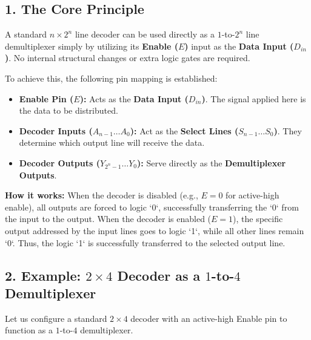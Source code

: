 \documentclass[12pt,a3paper]{article}
\begin{document}
\begin{enumerate}
\begin{tcolorbox}[enhanced,breakable,ansbox,colback=cD!4,colframe=cD,boxrule=0.8pt,arc=5pt,title={\textbf{Answer}},fonttitle=\bfseries\color{white},colbacktitle=cD]
\subsection*{1. The Core Principle}
A standard $n \times 2^n$ line decoder can be used directly as a $1$-to-$2^n$ line demultiplexer simply by utilizing its \textbf{Enable ($E$)} input as the \textbf{Data Input ($D_{in}$)}. No internal structural changes or extra logic gates are required.

To achieve this, the following pin mapping is established:
\begin{itemize}
    \item \textbf{Enable Pin ($E$):} Acts as the \textcolor{cD}{\textbf{Data Input ($D_{in}$)}}. The signal applied here is the data to be distributed.
    \item \textbf{Decoder Inputs ($A_{n-1} \dots A_0$):} Act as the \textbf{Select Lines ($S_{n-1} \dots S_0$)}. They determine which output line will receive the data.
    \item \textbf{Decoder Outputs ($Y_{2^n-1} \dots Y_0$):} Serve directly as the \textbf{Demultiplexer Outputs}.
\end{itemize}

\textbf{How it works:} 
When the decoder is disabled (e.g., $E = 0$ for active-high enable), all outputs are forced to logic `0`, successfully transferring the `0` from the input to the output. When the decoder is enabled ($E = 1$), the specific output addressed by the input lines goes to logic `1`, while all other lines remain `0`. Thus, the logic `1` is successfully transferred to the selected output line.

\vspace{0.2cm}
\subsection*{2. Example: $2 \times 4$ Decoder as a $1$-to-$4$ Demultiplexer}
Let us configure a standard $2 \times 4$ decoder with an active-high Enable pin to function as a $1$-to-$4$ demultiplexer. 


\end{tcolorbox}
\end{enumerate}
\end{document}
